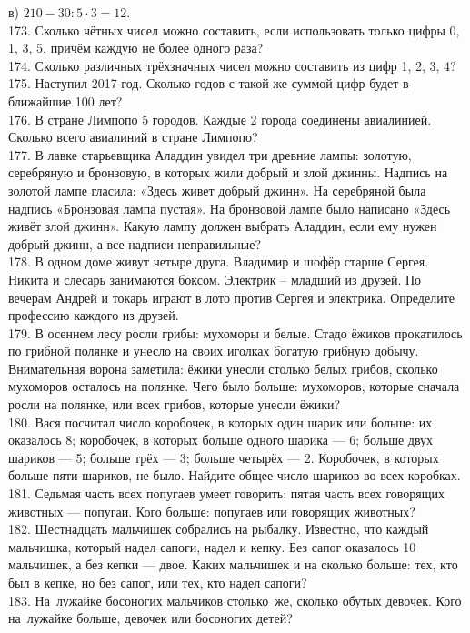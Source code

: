 в) $210-30:5\cdot3=12.$\\
173. Сколько чётных чисел можно составить, если использовать только цифры 0, 1, 3, 5, причём каждую не более одного раза?\\
174. Сколько различных трёхзначных чисел можно составить из цифр 1, 2, 3, 4?\\
175. Наступил 2017 год. Сколько годов с такой же суммой цифр будет в ближайшие 100 лет?\\
176. В стране Лимпопо 5 городов. Каждые 2 города соединены авиалинией. Сколько всего авиалиний в стране Лимпопо?\\
177. В лавке старьевщика Аладдин увидел три древние лампы: золотую, серебряную и бронзовую, в которых жили добрый и злой джинны. Надпись на золотой лампе гласила: «Здесь живет добрый джинн». На серебряной была надпись «Бронзовая лампа пустая». На бронзовой лампе было написано «Здесь живёт злой джинн». Какую лампу должен выбрать Аладдин, если ему нужен добрый джинн, а все надписи неправильные?\\
178. В одном доме живут четыре друга. Владимир и шофёр старше Сергея. Никита и слесарь занимаются боксом. Электрик – младший из друзей. По вечерам Андрей и токарь играют в лото против Сергея и электрика. Определите профессию каждого из друзей.\\
179. В осеннем лесу росли грибы: мухоморы и белые. Стадо ёжиков прокатилось по грибной полянке и унесло на своих иголках богатую грибную добычу. Внимательная ворона заметила: ёжики унесли столько белых грибов, сколько мухоморов осталось на полянке. Чего было больше: мухоморов, которые сначала росли на полянке, или всех грибов, которые унесли ёжики?\\
180. Вася посчитал число коробочек, в которых один шарик или больше: их оказалось 8; коробочек, в которых больше одного шарика --- 6; больше двух шариков --- 5; больше трёх --- 3; больше четырёх --- 2. Коробочек, в которых больше пяти шариков, не было. Найдите общее число шариков во всех коробках.\\
181. Седьмая часть всех попугаев умеет говорить; пятая часть всех говорящих животных --- попугаи. Кого больше: попугаев или говорящих животных?\\
182. Шестнадцать мальчишек собрались на рыбалку. Известно, что каждый мальчишка, который надел сапоги, надел и кепку. Без сапог оказалось 10 мальчишек, а без кепки --- двое. Каких мальчишек и на сколько больше: тех, кто был в кепке, но без сапог, или тех, кто надел сапоги?\\
183. На лужайке босоногих мальчиков столько же, сколько обутых девочек. Кого на лужайке больше, девочек или босоногих детей?\\
